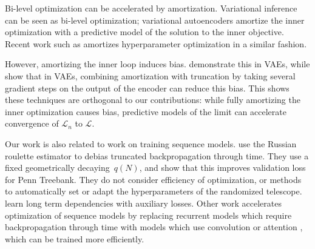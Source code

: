 Bi-level optimization can be accelerated by amortization.
Variational inference can be seen as bi-level optimization; variational autoencoders \citep{kingma2013auto} amortize the inner optimization with a predictive model of the solution to the inner objective.
Recent work such as \citet{brock2018smash, lorraine2018stochastic} amortizes hyperparameter optimization in a similar fashion.

However, amortizing the inner loop induces bias.
\citet{cremer2018inference} demonstrate this in VAEs, while \citet{kim2018semi} show that in VAEs, combining amortization with truncation by taking several gradient steps on the output of the encoder can reduce this bias.
This shows these techniques are orthogonal to our contributions: while fully amortizing the inner optimization causes bias, predictive models of the limit can accelerate convergence of $\mathcal{L}_n$ to $\mathcal{L}$.

Our work is also related to work on training sequence models.
\citet{tallec2017unbiasing} use the Russian roulette estimator to debias truncated backpropagation through time.
They use a fixed geometrically decaying~$q(N)$, and show that this improves validation loss for Penn Treebank.
They do not consider efficiency of optimization, or methods to automatically set or adapt the hyperparameters of the randomized telescope.
\citet{trinh2018learning} learn long term dependencies with auxiliary losses.
Other work accelerates optimization of sequence models by replacing recurrent models which require backpropagation through time with models which use convolution or attention \citep{vaswani2017attention}, which can be trained more efficiently.
